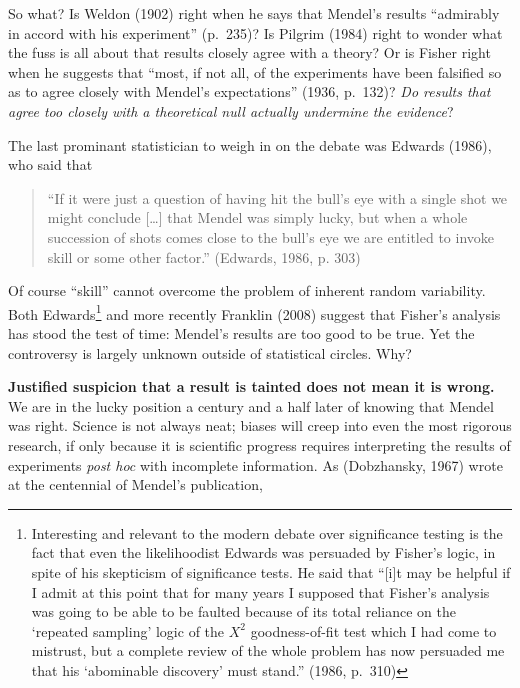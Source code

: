 \documentclass[english,floatsintext,man]{apa6}
\theoremstyle{definition}
\theoremstyle{definition}
\theoremstyle{definition}
\theoremstyle{remark}
\begin{document}
So what? Is Weldon (1902) right when he says that Mendel's results
\enquote{admirably in accord with his experiment} (p.~235)? Is Pilgrim
(1984) right to wonder what the fuss is all about that results closely
agree with a theory? Or is Fisher right when he suggests that
\enquote{most, if not all, of the experiments have been falsified so as
to agree closely with Mendel's expectations} (1936, p.~132)? \emph{Do
results that agree too closely with a theoretical null actually
undermine the evidence}?

The last prominant statistician to weigh in on the debate was Edwards
(1986), who said that

\begin{quote}
\enquote{If it were just a question of having hit the bull's eye with a
single shot we might conclude {[}\ldots{}{]} that Mendel was simply
lucky, but when a whole succession of shots comes close to the bull's
eye we are entitled to invoke skill or some other factor.} (Edwards,
1986, p. 303)
\end{quote}

Of course \enquote{skill} cannot overcome the problem of inherent random
variability. Both Edwards\footnote{Interesting and relevant to the
  modern debate over significance testing is the fact that even the
  likelihoodist Edwards was persuaded by Fisher's logic, in spite of his
  skepticism of significance tests. He said that \enquote{{[}i{]}t may
  be helpful if I admit at this point that for many years I supposed
  that Fisher's analysis was going to be able to be faulted because of
  its total reliance on the \enquote{repeated sampling} logic of the
  \(X^2\) goodness-of-fit test which I had come to mistrust, but a
  complete review of the whole problem has now persuaded me that his
  \enquote{abominable discovery} must stand.} (1986, p.~310)} and more
recently Franklin (2008) suggest that Fisher's analysis has stood the
test of time: Mendel's results are too good to be true. Yet the
controversy is largely unknown outside of statistical circles. Why?

\textbf{Justified suspicion that a result is tainted does not mean it is
wrong.} We are in the lucky position a century and a half later of
knowing that Mendel was right. Science is not always neat; biases will
creep into even the most rigorous research, if only because it is
scientific progress requires interpreting the results of experiments
\emph{post hoc} with incomplete information. As (Dobzhansky, 1967) wrote
at the centennial of Mendel's publication,
\end{document}
